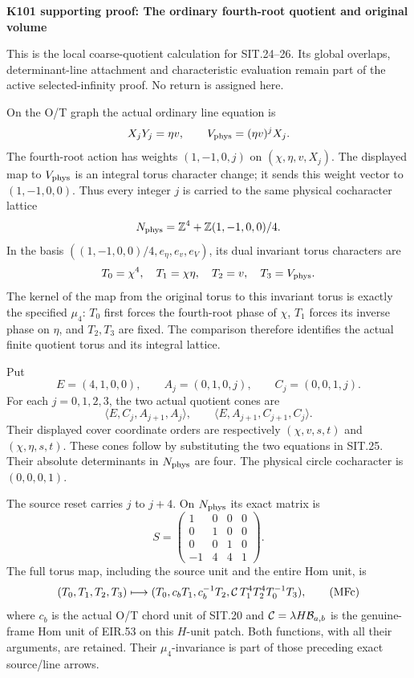 \par\bigskip\noindent\textbf{K101 supporting proof: The ordinary fourth-root quotient and original volume}\par\nobreak
This is the local coarse-quotient calculation for SIT.24--26. Its global overlaps, determinant-line attachment and characteristic evaluation remain part of the active selected-infinity proof. No return is assigned here.

On the O/T graph the actual ordinary line equation is
\[
 X_jY_j=\eta v,\qquad V_{\rm phys}=(\eta v)^jX_j .
\]
The fourth-root action has weights \((1,-1,0,j)\) on
\((\chi,\eta,v,X_j)\). The displayed map to \(V_{\rm phys}\) is an integral torus character change; it sends this weight vector to \((1,-1,0,0)\). Thus every integer \(j\) is carried to the same physical cocharacter lattice
\[
 N_{\rm phys}=\mathbb Z^4+
       \mathbb Z(1,-1,0,0)/4.
\]
In the basis \(((1,-1,0,0)/4,e_\eta,e_v,e_V)\), its dual invariant torus characters are
\[
 T_0=\chi^4,\quad T_1=\chi\eta,\quad T_2=v,\quad T_3=V_{\rm phys}.
\]
The kernel of the map from the original torus to this invariant torus is exactly the specified \(\mu_4\): \(T_0\) first forces the fourth-root phase of \(\chi\), \(T_1\) forces its inverse phase on \(\eta\), and \(T_2,T_3\) are fixed. The comparison therefore identifies the actual finite quotient torus and its integral lattice.

Put
\[
 E=(4,1,0,0),\qquad A_j=(0,1,0,j),\qquad C_j=(0,0,1,j).
\]
For each \(j=0,1,2,3\), the two actual quotient cones are
\[
 \langle E,C_j,A_{j+1},A_j\rangle,\qquad
 \langle E,A_{j+1},C_{j+1},C_j\rangle.                         \tag{MFa}
\]
Their displayed cover coordinate orders are respectively
\((\chi,v,s,t)\) and \((\chi,\eta,s,t)\). These cones follow by substituting the two equations in SIT.25. Their absolute determinants in \(N_{\rm phys}\) are four. The physical circle cocharacter is \((0,0,0,1)\).

The source reset carries \(j\) to \(j+4\). On \(N_{\rm phys}\) its exact matrix is
\[
 S=\begin{pmatrix}
 1&0&0&0\\0&1&0&0\\0&0&1&0\\-1&4&4&1
 \end{pmatrix}.                                             \tag{MFb}
\]
The full torus map, including the source unit and the entire Hom unit, is
\[
 (T_0,T_1,T_2,T_3)\longmapsto
 (T_0,c_bT_1,c_b^{-1}T_2,
   {\cal C}\,T_1^4T_2^4T_0^{-1}T_3),                         \tag{MFc}
\]
where \(c_b\) is the actual O/T chord unit of SIT.20 and
\({\cal C}=\lambda H\mathcal B_{a,b}\) is the genuine-frame Hom unit of EIR.53 on this \(H\)-unit patch. Both functions, with all their arguments, are retained. Their \(\mu_4\)-invariance is part of those preceding exact source/line arrows.

